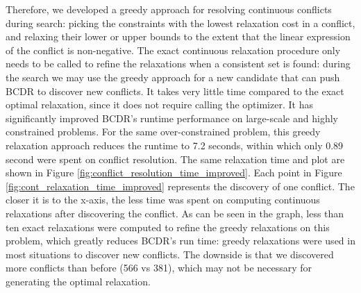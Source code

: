 \documentclass[jair,twoside,11pt,theapa]{article}
\begin{document}
Therefore, we developed a greedy approach for resolving continuous conflicts during search:
picking the constraints with the lowest relaxation cost in a conflict, and
relaxing their lower or upper bounds to the extent that the linear expression of
the conflict is non-negative. The exact continuous relaxation procedure only
needs to be called to refine the relaxations when a consistent set is found:
during the search we may use the greedy approach for a new candidate that can
push BCDR to discover new conflicts. It takes very little time compared to the
exact optimal relaxation, since it does not require calling the optimizer. It
has significantly improved BCDR's runtime performance on large-scale and highly
constrained problems. For the same over-constrained problem, this greedy
relaxation approach reduces the runtime to 7.2 seconds, within which only 0.89
second were spent on conflict resolution. The same relaxation time and plot are
shown in Figure \ref{fig:conflict_resolution_time_improved}. Each point in
Figure \ref{fig:cont_relaxation_time_improved} represents the discovery of one
conflict. The closer it is to the x-axis, the less time was spent on computing
continuous relaxations after discovering the conflict. As can be seen in the
graph, less than ten exact relaxations were computed to refine the greedy
relaxations on this problem, which greatly reduces BCDR's run time: greedy
relaxations were used in most situations to discover new conflicts. The
downside is that we discovered more conflicts than before (566 vs 381), which
may not be necessary for generating the optimal relaxation.
\end{document}
